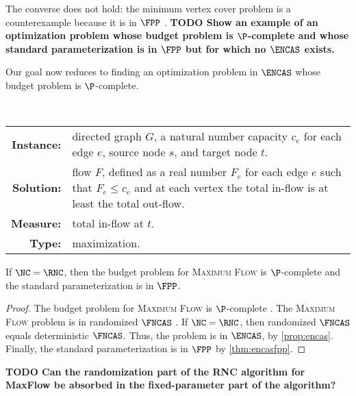 \documentclass{article}
\newcommand{\todo}[1]{\textbf{TODO #1}}
\begin{document}
The converse does not hold: the minimum vertex cover problem is a counterexample because it is in $\FPP$ \autocite[Theorem~4.5]{bst15}.
\todo{Show an example of an optimization problem whose budget problem is $\P$-complete and whose standard parameterization is in $\FPP$ but for which no $\ENCAS$ exists.}

Our goal now reduces to finding an optimization problem in $\ENCAS$ whose budget problem is $\P$-complete.

\begin{definition}
  \mbox{} \\
  \begin{tabular}{r p{9.2cm}}
    \textbf{Instance:} & directed graph $G$, a natural number capacity $c_e$ for each edge $e$, source node $s$, and target node $t$. \\
    \textbf{Solution:} & flow $F$, defined as a real number $F_e$ for each edge $e$ such that $F_e \leq c_e$ and at each vertex the total in-flow is at least the total out-flow. \\
    \textbf{Measure:} & total in-flow at $t$. \\
    \textbf{Type:} & maximization.
  \end{tabular}
\end{definition}


\begin{theorem}
  If $\NC = \RNC$, then the budget problem for \textsc{Maximum Flow} is $\P$-complete and the standard parameterization is in $\FPP$.
\end{theorem}
\begin{proof}
  The budget problem for \textsc{Maximum Flow} is $\P$-complete \autocite[Problem~A.4.4]{ghr95}.
  The \textsc{Maximum Flow} problem is in randomized $\FNCAS$ \autocite[Theorem~4.5.2]{dsst97}.
  If $\NC = \RNC$, then randomized $\FNCAS$ equals deterministic $\FNCAS$.
  Thus, the problem is in $\ENCAS$, by \autoref{prop:encas}.
  Finally, the standard parameterization is in $\FPP$ by \autoref{thm:encasfpp}.
\end{proof}

\todo{Can the randomization part of the RNC algorithm for MaxFlow be absorbed in the fixed-parameter part of the algorithm?}
\end{document}
